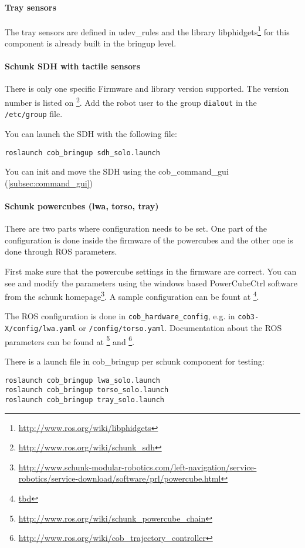 \paragraph{Tray sensors}
The tray sensors are defined in udev\_rules and the library libphidgets\footnote{\url{http://www.ros.org/wiki/libphidgets}} for this component is already built in the bringup level.

\paragraph{Schunk SDH with tactile sensors}
There is only one specific Firmware and library version supported. The version number is listed on \footnote{\url{http://www.ros.org/wiki/schunk_sdh}}. Add the robot user to the group \texttt{dialout} in the \texttt{/etc/group} file.

You can launch the SDH with the following file:
\begin{lstlisting}
roslaunch cob_bringup sdh_solo.launch
\end{lstlisting}

You can init and move the SDH using the cob\_command\_gui (\ref{subsec:command_gui})

\paragraph{Schunk powercubes (lwa, torso, tray)}
There are two parts where configuration needs to be set. One part of the configuration is done inside the firmware of the powercubes and the other one is done through ROS parameters.

First make sure that the powercube settings in the firmware are correct. You can see and modify the parameters using the windows based PowerCubeCtrl software from the schunk homepage\footnote{\url{http://www.schunk-modular-robotics.com/left-navigation/service-robotics/service-download/software/prl/powercube.html}}. A sample configuration can be fount at \footnote{\url{tbd}}.

The ROS configuration is done in \texttt{cob\_hardware\_config}, e.g. in \texttt{cob3-X/config/lwa.yaml} or \texttt{/config/torso.yaml}. Documentation about the ROS parameters can be found at \footnote{\url{http://www.ros.org/wiki/schunk_powercube_chain}} and \footnote{\url{http://www.ros.org/wiki/cob_trajectory_controller}}.

There is a launch file in cob\_bringup per schunk component for testing:

\begin{lstlisting}
roslaunch cob_bringup lwa_solo.launch
roslaunch cob_bringup torso_solo.launch
roslaunch cob_bringup tray_solo.launch
\end{lstlisting}

